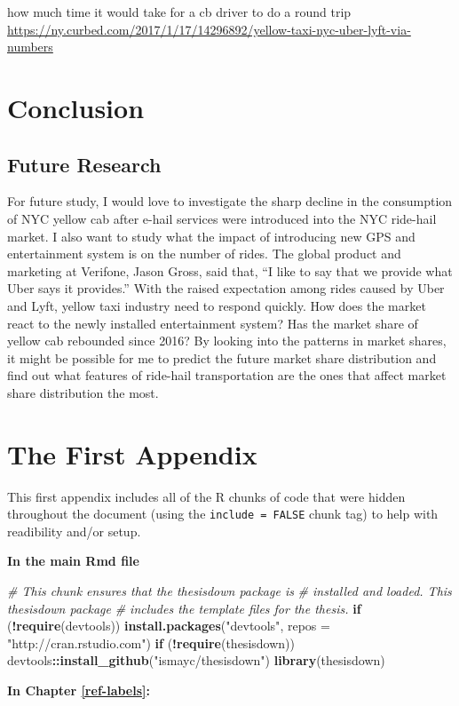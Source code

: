 \documentclass[12pt,twoside]{reedthesis}
\newenvironment{Shaded}{\begin{snugshade}}{\end{snugshade}}
\newcommand{\KeywordTok}[1]{\textcolor[rgb]{0.13,0.29,0.53}{\textbf{#1}}}
\newcommand{\DataTypeTok}[1]{\textcolor[rgb]{0.13,0.29,0.53}{#1}}
\newcommand{\StringTok}[1]{\textcolor[rgb]{0.31,0.60,0.02}{#1}}
\newcommand{\CommentTok}[1]{\textcolor[rgb]{0.56,0.35,0.01}{\textit{#1}}}
\newcommand{\ControlFlowTok}[1]{\textcolor[rgb]{0.13,0.29,0.53}{\textbf{#1}}}
\newcommand{\OperatorTok}[1]{\textcolor[rgb]{0.81,0.36,0.00}{\textbf{#1}}}
\newcommand{\NormalTok}[1]{#1}
\theoremstyle{definition}
\theoremstyle{definition}
\theoremstyle{definition}
\theoremstyle{remark}
\begin{document}
how much time it would take for a cb driver to do a round trip
\url{https://ny.curbed.com/2017/1/17/14296892/yellow-taxi-nyc-uber-lyft-via-numbers}

\chapter{Conclusion}\label{chapter5}

\section{Future Research}\label{future-research}

For future study, I would love to investigate the sharp decline in the
consumption of NYC yellow cab after e-hail services were introduced into
the NYC ride-hail market. I also want to study what the impact of
introducing new GPS and entertainment system is on the number of rides.
The global product and marketing at Verifone, Jason Gross, said that,
``I like to say that we provide what Uber says it provides.'' With the
raised expectation among rides caused by Uber and Lyft, yellow taxi
industry need to respond quickly. How does the market react to the newly
installed entertainment system? Has the market share of yellow cab
rebounded since 2016? By looking into the patterns in market shares, it
might be possible for me to predict the future market share distribution
and find out what features of ride-hail transportation are the ones that
affect market share distribution the most.

\appendix

\chapter{The First Appendix}\label{the-first-appendix}

This first appendix includes all of the R chunks of code that were
hidden throughout the document (using the \texttt{include\ =\ FALSE}
chunk tag) to help with readibility and/or setup.

\textbf{In the main Rmd file}
\begin{Shaded}
\begin{Highlighting}[]
\CommentTok{# This chunk ensures that the thesisdown package is}
\CommentTok{# installed and loaded. This thesisdown package}
\CommentTok{# includes the template files for the thesis.}
\ControlFlowTok{if}\NormalTok{ (}\OperatorTok{!}\KeywordTok{require}\NormalTok{(devtools)) }\KeywordTok{install.packages}\NormalTok{(}\StringTok{"devtools"}\NormalTok{, }
    \DataTypeTok{repos =} \StringTok{"http://cran.rstudio.com"}\NormalTok{)}
\ControlFlowTok{if}\NormalTok{ (}\OperatorTok{!}\KeywordTok{require}\NormalTok{(thesisdown)) devtools}\OperatorTok{::}\KeywordTok{install_github}\NormalTok{(}\StringTok{"ismayc/thesisdown"}\NormalTok{)}
\KeywordTok{library}\NormalTok{(thesisdown)}
\end{Highlighting}
\end{Shaded}
\textbf{In Chapter \ref{ref-labels}:}
\end{document}

